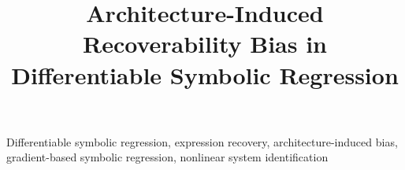 \documentclass{article}
\title{Architecture-Induced Recoverability Bias in
  Differentiable Symbolic Regression}
\begin{document}
\ninept
\maketitle

\begin{abstract}

\end{abstract}

\begin{keywords}
Differentiable symbolic regression, expression recovery, architecture-induced bias, gradient-based symbolic regression, nonlinear system identification
\end{keywords}










\end{document}

